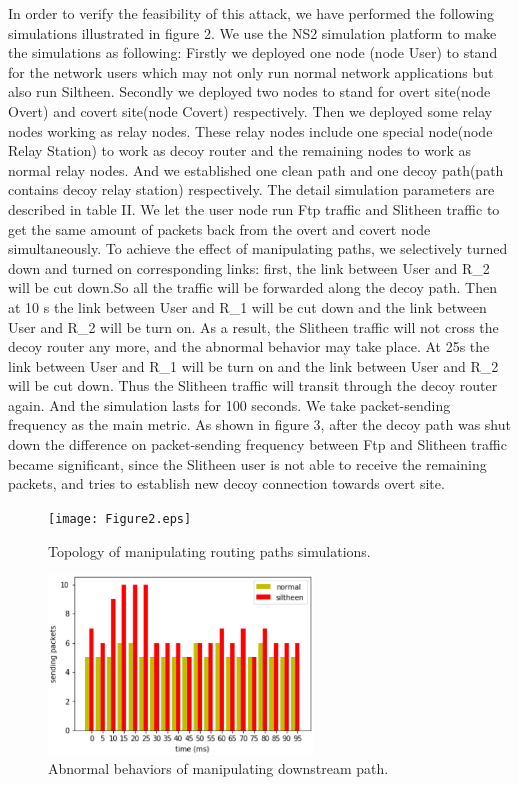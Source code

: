 \documentclass[conference]{IEEEtran}
\begin{document}
In order to verify the feasibility of this attack, we have performed the following simulations illustrated in figure 2. We use the NS2 simulation platform to make the simulations as following: Firstly we deployed one node (node User) to stand for the network users which may not only run normal network applications but also run Siltheen. Secondly we deployed two nodes to stand for overt site(node Overt) and covert site(node Covert) respectively. Then we deployed some relay nodes working as relay nodes. These relay nodes include one special node(node Relay Station) to work as decoy router and the remaining nodes to work as normal relay nodes. And we established one clean path and one decoy path(path contains decoy relay station) respectively. The detail simulation parameters are described in table II. We let the user node run Ftp traffic and Slitheen traffic to get the same amount of packets back from the overt and covert node simultaneously. To achieve the effect of manipulating paths, we selectively turned down and turned on corresponding links: first, the link between User and R\_2 will be cut down.So all the traffic will be forwarded along the decoy path. Then at 10 s the link between User and R\_1 will be cut down and the link between User and R\_2 will be turn on. As a result, the Slitheen traffic will not cross the decoy router any more, and the abnormal behavior may take place. At 25s the link between User and R\_1 will be turn on  and the link between User and R\_2 will be cut down. Thus the Slitheen traffic will transit through the decoy router again. And the simulation lasts for 100 seconds. We take packet-sending frequency as the main metric. As shown in figure 3, after the decoy path was shut down the difference on packet-sending frequency between Ftp and Slitheen traffic became significant, since the Slitheen user is not able to receive the remaining packets, and tries to establish new decoy connection towards overt site. 


\begin{figure}[htbp]
	\centerline{\texttt{[image: Figure2.eps]}}
	\caption{Topology of manipulating routing paths simulations.}
	\label{fig}
\end{figure}

\begin{figure}[htbp]
	\centerline{\includegraphics[width=7cm]{Figure3.eps}}
	\caption{Abnormal behaviors of manipulating downstream path.}
	\label{fig}
\end{figure}
\end{document}
